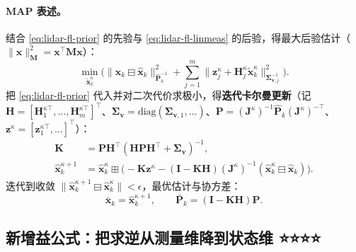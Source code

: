 \paragraph{MAP 表述。}
结合 \cref{eq:lidar-fl-prior} 的先验与 \cref{eq:lidar-fl-linmeas} 的后验，得最大后验估计（$\|\mathbf{x}\|^2_{\mathbf{M}}=\mathbf{x}^\top\mathbf{M}\mathbf{x}$）：
\begin{equation}
  \min_{\tilde{\mathbf{x}}^\kappa_k}\bigg(\big\|\mathbf{x}_k\boxminus\hat{\mathbf{x}}_k\big\|^2_{\hat{\mathbf{P}}_k^{-1}}+\sum_{j=1}^m\big\|\mathbf{z}^\kappa_j+\mathbf{H}^\kappa_j\tilde{\mathbf{x}}^\kappa_k\big\|^2_{\boldsymbol{\Sigma}_{\mathbf{v},j}^{-1}}\bigg).
  \label{eq:lidar-fl-map}
\end{equation}
把 \cref{eq:lidar-fl-prior} 代入并对二次代价求极小，得\textbf{迭代卡尔曼更新}（记 $\mathbf{H}=[\mathbf{H}^{\kappa\top}_1,\dots,\mathbf{H}^{\kappa\top}_m]^\top$、$\boldsymbol{\Sigma}_{\mathbf{v}}=\mathrm{diag}(\boldsymbol{\Sigma}_{\mathbf{v},1},\dots)$、$\mathbf{P}=(\mathbf{J}^\kappa)^{-1}\hat{\mathbf{P}}_k(\mathbf{J}^\kappa)^{-\top}$、$\mathbf{z}^\kappa=[\mathbf{z}^{\kappa\top}_1,\dots]^\top$）：
\begin{align}
  \mathbf{K}&=\mathbf{P}\mathbf{H}^\top(\mathbf{H}\mathbf{P}\mathbf{H}^\top+\boldsymbol{\Sigma}_{\mathbf{v}})^{-1}, \label{eq:lidar-fl-gain-old}\\
  \hat{\mathbf{x}}^{\kappa+1}_k&=\hat{\mathbf{x}}^\kappa_k\boxplus\Big(-\mathbf{K}\mathbf{z}^\kappa-(\mathbf{I}-\mathbf{K}\mathbf{H})(\mathbf{J}^\kappa)^{-1}(\hat{\mathbf{x}}^\kappa_k\boxminus\hat{\mathbf{x}}_k)\Big). \label{eq:lidar-fl-xupdate}
\end{align}
迭代到收敛 $\|\hat{\mathbf{x}}^{\kappa+1}_k\boxminus\hat{\mathbf{x}}^\kappa_k\|<\epsilon$，最优估计与协方差：
\begin{equation}
  \bar{\mathbf{x}}_k=\hat{\mathbf{x}}^{\kappa+1}_k,\qquad \bar{\mathbf{P}}_k=(\mathbf{I}-\mathbf{K}\mathbf{H})\mathbf{P}.
  \label{eq:lidar-fl-final}
\end{equation}

\subsection{新增益公式：把求逆从测量维降到状态维 ⭐⭐⭐⭐}
\label{sec:lidar-fl-gain}

